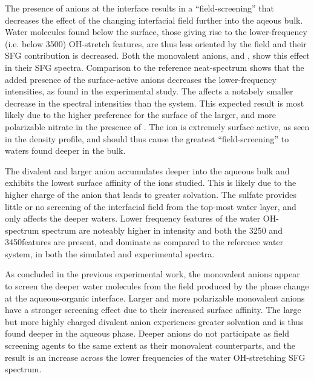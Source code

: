 The presence of anions at the interface results in a ``field-screening'' that decreases the effect of the changing interfacial field further into the aqeous bulk. Water molecules found below the surface, those giving rise to the lower-frequency (i.e. below 3500\cm) OH-stretch features, are thus less oriented by the field and their SFG contribution is decreased. Both the monovalent anions, \cl and \nit, show this effect in their SFG spectra. Comparison to the reference neat-\wat spectrum shows that the added presence of the surface-active anions decreases the lower-frequency intensities, as found in the experimental study. The \cl affects a notabely smaller decrease in the spectral intensities than the \nit system. This expected result is most likely due to the higher preference for the surface of the larger, and more polarizable nitrate in the presence of \ctc. The \nit ion is extremely surface active, as seen in the density profile, and should thus cause the greatest ``field-screening'' to waters found deeper in the bulk.

The divalent and larger \sul anion accumulates deeper into the aqueous bulk and exhibits the lowest surface affinity of the ions studied. This is likely due to the higher charge of the anion that leads to greater solvation. The sulfate provides little or no screening of the interfacial field from the top-most water layer, and only affects the deeper waters. Lower frequency features of the water OH-spectrum spectrum are noteably higher in intensity and both the 3250 and 3450\cm features are present, and dominate as compared to the reference water system, in both the simulated and experimental spectra.

As concluded in the previous experimental work, the monovalent anions appear to screen the deeper water molecules from the field produced by the phase change at the aqueous-organic interface. Larger and more polarizable monovalent anions have a stronger screening effect due to their increased surface affinity. The large but more highly charged divalent anion experiences greater solvation and is thus found deeper in the aqueous phase. Deeper anions do not participate as field screening agents to the same extent as their monovalent counterparts, and the result is an increase across the lower frequencies of the water OH-stretching SFG spectrum.
